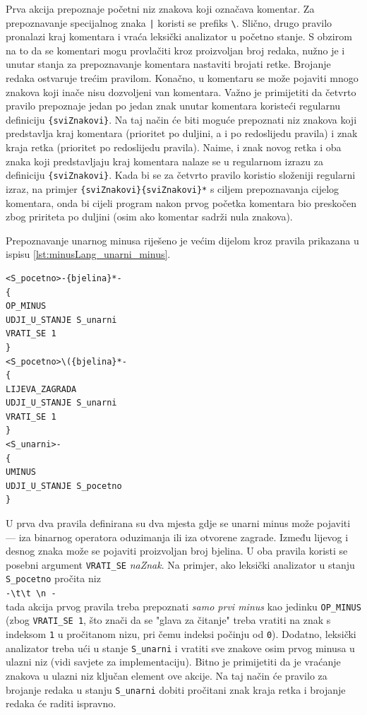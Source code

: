 \documentclass[times, 12pt, utf8]{book}
\begin{document}
Prva akcija prepoznaje početni niz znakova koji označava komentar.
Za prepoznavanje specijalnog znaka \verb=|= koristi se prefiks \verb|\|.
Slično, drugo pravilo pronalazi kraj komentara i vraća leksički analizator u početno stanje.
S obzirom na to da se komentari mogu provlačiti kroz proizvoljan broj redaka, nužno je i unutar stanja za prepoznavanje komentara nastaviti brojati retke.
Brojanje redaka ostvaruje trećim pravilom.
Konačno, u komentaru se može pojaviti mnogo znakova koji inače nisu dozvoljeni van komentara.
Važno je primijetiti da četvrto pravilo prepoznaje jedan po jedan znak unutar komentara koristeći regularnu definiciju \verb|{sviZnakovi}|.
Na taj način će biti moguće prepoznati niz znakova koji predstavlja kraj komentara (prioritet po duljini, a i po redoslijedu pravila) i znak kraja retka (prioritet po redoslijedu pravila).
Naime, i znak novog retka i oba znaka koji predstavljaju kraj komentara nalaze se u regularnom izrazu za definiciju \verb|{sviZnakovi}|.
Kada bi se za četvrto pravilo koristio složeniji regularni izraz, na primjer \verb|{sviZnakovi}{sviZnakovi}*| s ciljem prepoznavanja cijelog komentara, onda bi cijeli program nakon prvog početka komentara bio preskočen zbog pririteta po duljini (osim ako komentar sadrži nula znakova).

Prepoznavanje unarnog minusa riješeno je većim dijelom kroz pravila prikazana u ispisu \ref{lst:minusLang_unarni_minus}.

\begin{lstlisting}[caption={Pravila za detekciju unarnog minusa.},label=lst:minusLang_unarni_minus]
<S_pocetno>-{bjelina}*-
{
OP_MINUS
UDJI_U_STANJE S_unarni
VRATI_SE 1
}
<S_pocetno>\({bjelina}*-
{
LIJEVA_ZAGRADA
UDJI_U_STANJE S_unarni
VRATI_SE 1
}
<S_unarni>-
{
UMINUS
UDJI_U_STANJE S_pocetno
}
\end{lstlisting}

U prva dva pravila definirana su dva mjesta gdje se unarni minus može pojaviti --- iza binarnog operatora oduzimanja ili iza otvorene zagrade.
Između lijevog i desnog znaka može se pojaviti proizvoljan broj bjelina.
U oba pravila koristi se posebni argument \verb|VRATI_SE| \emph{naZnak}.
Na primjer, ako leksički analizator u stanju \verb|S_pocetno| pročita niz\\
\verb|-\t\t \n -|\\
tada akcija prvog pravila treba prepoznati \emph{samo prvi minus} kao jedinku \verb|OP_MINUS| (zbog \verb|VRATI_SE 1|, što znači da se "glava za čitanje" treba vratiti na znak s indeksom \verb|1| u pročitanom nizu, pri čemu indeksi počinju od \verb|0|).
Dodatno, leksički analizator treba ući u stanje \verb|S_unarni| i vratiti sve znakove osim prvog minusa u ulazni niz (vidi savjete za implementaciju).
Bitno je primijetiti da je vraćanje znakova u ulazni niz ključan element ove akcije.
Na taj način će pravilo za brojanje redaka u stanju \verb|S_unarni| dobiti pročitani znak kraja retka i brojanje redaka će raditi ispravno.
\end{document}
